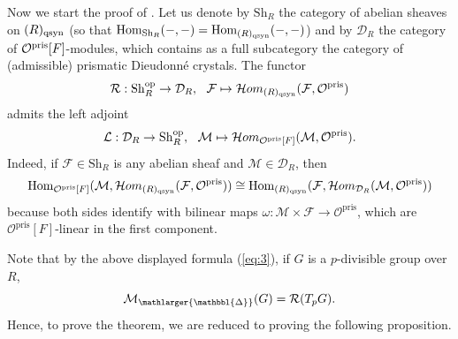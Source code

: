 \documentclass{amsart}
\newcommand{\prism}{{\mathlarger{\mathbbl{\Delta}}}}
\theoremstyle{plain}
\theoremstyle{definition}
\newcommand{\pris}{\mathrm{pris}}
\begin{document}
Now we start the proof of . Let us denote by $\mathrm{Sh}_R$ the category of abelian sheaves on $(R)_{\rm qsyn}$ (so that $\mathrm{Hom}_{\mathrm{Sh}_R}(-,-)=\mathrm{Hom}_{(R)_{\rm qsyn}}(-,-)$) and by $\mathcal{D}_R$ the category of $\mathcal{O}^{\rm pris}[F]$-modules, which contains as a full subcategory the category of (admissible) prismatic Dieudonn\'e crystals. The functor
$$
\mathcal{R}: \mathrm{Sh}_R^{\rm op} \to \mathcal{D}_R, ~~ \mathcal{F} \mapsto \mathcal{H}om_{(R)_{\rm qsyn}}(\mathcal{F}, \mathcal{O}^{\rm pris})
$$
admits the left adjoint 
$$
\mathcal{L}: \mathcal{D}_R \to \mathrm{Sh}_R^{\rm op}, ~~ \mathcal{M} \mapsto \mathcal{H}om_{\mathcal{O}^{\rm pris}[F]}(\mathcal{M},\mathcal{O}^{\rm pris}).
$$
Indeed, if $\mathcal{F}\in \mathrm{Sh}_R$ is any abelian sheaf and $\mathcal{M}\in \mathcal{D}_R$, then
  $$
  \mathrm{Hom}_{\mathcal{O}^\pris[F]}(\mathcal{M},\mathcal{H}om_{(R)_{\rm qsyn}}(\mathcal{F},\mathcal{O}^\pris))\cong \mathrm{Hom}_{(R)_{\rm qsyn}}(\mathcal{F},\mathcal{H}om_{\mathcal{D}_R}(\mathcal{M},\mathcal{O}^\pris)) 
  $$
  because both sides identify with bilinear maps $\omega\colon \mathcal{M}\times \mathcal{F}\to \mathcal{O}^\pris$, which are $\mathcal{O}^\pris[F]$-linear in the first component.

Note that by the above displayed formula (\ref{eq:3}), if $G$ is a $p$-divisible group over $R$, 
$$
\mathcal{M}_\prism(G)= \mathcal{R}(T_pG).
$$
Hence, to prove the theorem, we are reduced to proving the following proposition.
\end{document}
